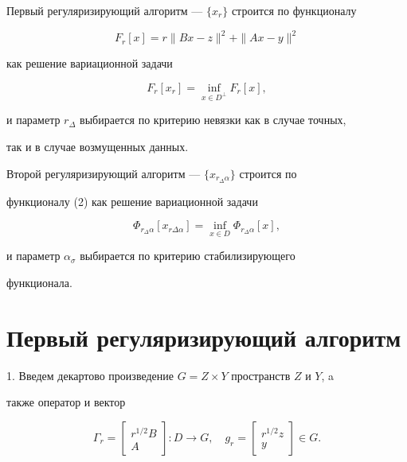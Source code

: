 Первый регуляризирующий алгоритм --- $\{x_r\}$ строится по функционалу 


\begin{equation} 


F_r[x]=r\|B x-z\|^2+\|Ax-y\|^2 


\end{equation} 


как решение вариационной задачи 


\begin{equation} 


F_r[x_r]=\inf_{x\in D^\bot}F_r[x], 


\end{equation} 


и параметр $r_\Delta$ выбирается по критерию невязки как в случае точных,


так и в случае возмущенных данных. 


 


Второй регуляризирующий алгоритм --- $\{x_{r_\Delta\alpha}\}$ строится по  


функционалу (2) как решение вариационной задачи 


\begin{equation} 


\Phi_{r_\Delta \alpha}[x_{r\Delta\alpha}]


=\inf_{x\in D}\Phi_{r_\Delta\alpha}[x], 


\end{equation} 


и параметр $\alpha_\sigma$ выбирается по критерию стабилизирующего 


функционала. 


 


\section{Первый регуляризирующий алгоритм} 


 


1. Введем декартово произведение $G=Z\times Y$ пространств $Z$ и $Y$, a  


также оператор и вектор 


\begin{equation} 


\Gamma_r= 


\begin{bmatrix} 


r^{1/2} B \\ A 


\end{bmatrix} 


:D\to G,\quad 


g_r=\begin{bmatrix} 


r^{1/2} z \\ y 


\end{bmatrix} 


\in G. 


\end{equation} 


